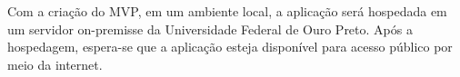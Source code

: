 \documentclass[
	12pt,				%
	openright,			%
	oneside,			%
	a4paper,			%
	english,			%
	brazil				%
	]{abntex2}
\begin{document}
Com a criação do MVP, em um ambiente local, a aplicação será hospedada em um servidor on-premisse da Universidade Federal de Ouro Preto. Após a hospedagem, espera-se que a aplicação esteja disponível para acesso público por meio da internet.













\end{document}
